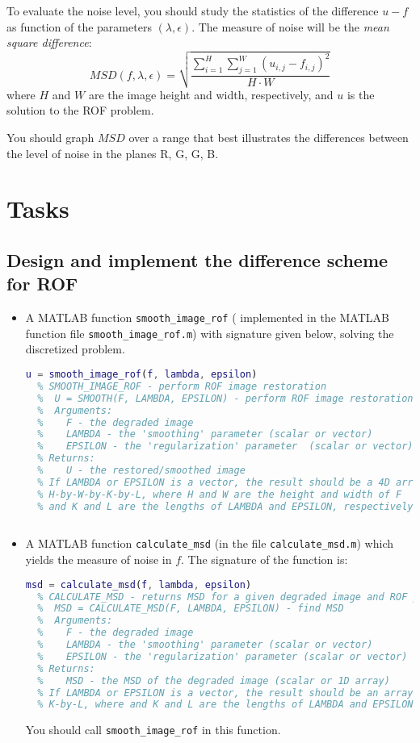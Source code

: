 \documentclass{article}
\begin{document}
To evaluate the noise level, you should study the statistics
of the difference \(u-f\) as function of the parameters \((\lambda, \epsilon)\).
The measure of noise will be the \emph{mean square difference}:
\[ MSD(f, \lambda,\epsilon) = \sqrt{\frac{\sum_{i=1}^H\sum_{j=1}^W(u_{i,j}-f_{i,j})^2}{H\cdot W}}\]
where \(H\) and \(W\) are the image height and width, respectively,
and \(u\) is the solution to the ROF problem.

You should graph \(MSD\) over a range that best illustrates the
differences between the level of noise in the planes R, G, G, B.

\section{Tasks}
\subsection{Design and implement the difference scheme for ROF}
\begin{itemize}
\item A MATLAB function \texttt{smooth\_image\_rof} ( implemented in the
  MATLAB function file \texttt{smooth\_image\_rof.m}) with signature
  given below, solving the discretized problem.
\begin{lstlisting}[language=MATLAB, caption={Processing of raw images}]
  u = smooth_image_rof(f, lambda, epsilon)
  % SMOOTH_IMAGE_ROF - perform ROF image restoration
  %  U = SMOOTH(F, LAMBDA, EPSILON) - perform ROF image restoration
  %  Arguments:
  %    F - the degraded image
  %    LAMBDA - the 'smoothing' parameter (scalar or vector)
  %    EPSILON - the 'regularization' parameter  (scalar or vector)
  % Returns:
  %    U - the restored/smoothed image
  % If LAMBDA or EPSILON is a vector, the result should be a 4D array of size
  % H-by-W-by-K-by-L, where H and W are the height and width of F
  % and K and L are the lengths of LAMBDA and EPSILON, respectively.
  
\end{lstlisting}
\item A MATLAB function \texttt{calculate\_msd} (in the file \texttt{calculate\_msd.m})
  which yields the measure of noise in \(f\). The
  signature of the function is:
\begin{lstlisting}[language=MATLAB, caption={Processing of raw images}]
  msd = calculate_msd(f, lambda, epsilon)
  % CALCULATE_MSD - returns MSD for a given degraded image and ROF parameters
  %  MSD = CALCULATE_MSD(F, LAMBDA, EPSILON) - find MSD
  %  Arguments:
  %    F - the degraded image
  %    LAMBDA - the 'smoothing' parameter (scalar or vector)
  %    EPSILON - the 'regularization' parameter (scalar or vector)
  % Returns:
  %    MSD - the MSD of the degraded image (scalar or 1D array)
  % If LAMBDA or EPSILON is a vector, the result should be an array of size
  % K-by-L, where and K and L are the lengths of LAMBDA and EPSILON, respectively.
\end{lstlisting}
You should call \texttt{smooth\_image\_rof} in this function.
\end{itemize}
\end{document}
